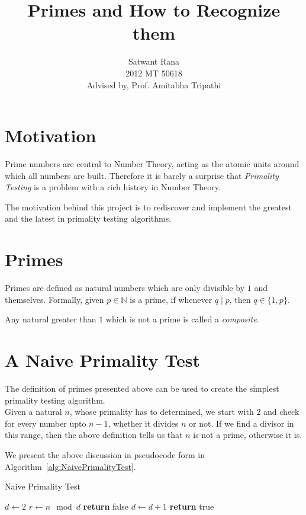 \documentclass[11pt]{article}
\title{\textbf{Primes and How to Recognize them}}
\author{Satwant Rana\\
		2012 MT 50618\\
		Advised by, Prof. Amitabha Tripathi}
\date{}
\begin{document}
\maketitle

\section{Motivation}

Prime numbers are central to Number Theory, acting as the atomic units around which all numbers are built. Therefore it is barely a surprise that \emph{Primality Testing} is a problem with a rich history in Number Theory. 

The motivation behind this project is to rediscover and implement the greatest and the latest in primality testing algorithms.

\section{Primes}

Primes are defined as natural numbers which are only divisible by $1$ and themselves. Formally, given $p \in \mathbb{N}$ is a prime, if whenever $q \mid p$, then $q \in \{1, p\}$.

Any natural greater than $1$ which is not a prime is called a \emph{composite}.

\section{A Naive Primality Test}

The definition of primes presented above can be used to create the simplest primality testing algorithm.\\ Given a natural $n$, whose primality has to determined, we start with $2$ and check for every number upto $n-1$, whether it divides $n$ or not. If we find a divisor in this range, then the above definition tells us that $n$ is not a prime, otherwise it is.

We present the above discussion in pseudocode form in Algorithm~\ref{alg:NaivePrimalityTest}.

\begin{algorithm}
\caption{Naive Primality Test}
\label{alg:NaivePrimalityTest}
\begin{algorithmic}
\State $d\gets 2$
\State $r \gets n \mod d$
	\State \textbf{return} false 
\EndIf
\State $d \gets d+1$
\EndWhile
\State \textbf{return} true 
\EndProcedure
\end{algorithmic}
\end{algorithm}
\end{document}
